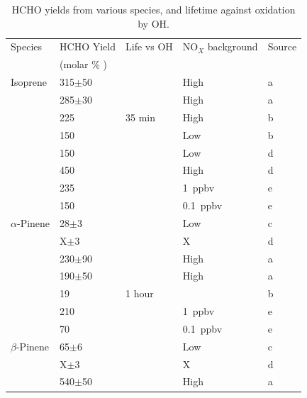      \begin{table} \begin{threeparttable}
          \caption{ HCHO yields from various species, and lifetime against oxidation by OH. }
          \begin{tabular}{  l  l  l  l  l  }
            \toprule
            Species    & HCHO Yield    & Life vs OH   & NO$_X$ background & Source   \\
            & (molar \% )   &              &                   &          \\
            \midrule 
            Isoprene	& 315$\pm$50      &            & High          & a        \\ 
            & 285$\pm$30      &            & High          & a        \\ 
            & 225             & 35 min     & High          & b        \\ %
            & 150             &            & Low           & b        \\ %
            & 150             &            & Low           & d        \\
            & 450             &            & High          & d        \\
            & 235             &            & 1~ppbv        & e        \\
            & 150             &            & 0.1~ppbv      & e        \\
            $\alpha$-Pinene & 28$\pm$3        &        & Low                & c        \\ 
            & X$\pm$3         &        & X                  & d        \\ 
            & 230$\pm$90      &        & High        & a        \\ 
            & 190$\pm$50      &        & High        & a        \\ 
            & 19              & 1 hour &              & b        \\ %
            & 210             &        & 1~ppbv        & e        \\
            & 70              &        & 0.1~ppbv      & e        \\
            $\beta$-Pinene  & 65$\pm$6        &        & Low           & c      \\ 
            & X$\pm$3         &        & X             & d      \\ 
            & 540$\pm$50      &        & High          & a     \\ 

\end{tabular}
\end{threeparttable}
\end{table}
